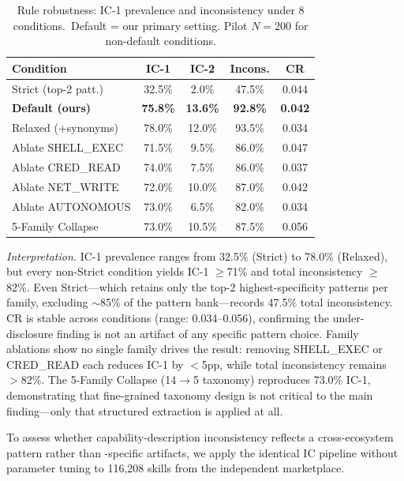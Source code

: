 \begin{table}[h]
\centering
\caption{Rule robustness: IC-1 prevalence and inconsistency under 8 conditions.\
  Default = our primary setting. Pilot $N{=}200$ for non-default conditions.}
\label{tab:robustness}
\footnotesize
\begin{tabular}{@{}p{3.0cm}cccc@{}}
\toprule
\textbf{Condition} & \textbf{IC-1} & \textbf{IC-2} & \textbf{Incons.} & \textbf{CR} \\
\midrule
Strict (top-2 patt.)      & 32.5\% & 2.0\%  & 47.5\% & 0.044 \\
\textbf{Default (ours)}   & \textbf{75.8\%} & \textbf{13.6\%} & \textbf{92.8\%} & \textbf{0.042} \\
Relaxed (+synonyms)       & 78.0\% & 12.0\% & 93.5\% & 0.034 \\
Ablate SHELL\_EXEC         & 71.5\% &  9.5\% & 86.0\% & 0.047 \\
Ablate CRED\_READ          & 74.0\% &  7.5\% & 86.0\% & 0.037 \\
Ablate NET\_WRITE          & 72.0\% & 10.0\% & 87.0\% & 0.042 \\
Ablate AUTONOMOUS          & 73.0\% &  6.5\% & 82.0\% & 0.034 \\
5-Family Collapse          & 73.0\% & 10.5\% & 87.5\% & 0.056 \\
\bottomrule
\end{tabular}
\end{table}

\noindent\textit{Interpretation.}
IC-1 prevalence ranges from 32.5\% (Strict) to 78.0\% (Relaxed), but every
non-Strict condition yields IC-1 $\geq$71\% and total inconsistency $\geq$82\%.
Even Strict---which retains only the top-2 highest-specificity patterns per
family, excluding $\sim$85\% of the pattern bank---records 47.5\% total
inconsistency.
CR is stable across conditions (range: 0.034--0.056), confirming the
under-disclosure finding is not an artifact of any specific pattern choice.
Family ablations show no single family drives the result: removing SHELL\_EXEC
or CRED\_READ each reduces IC-1 by $<$5pp, while total inconsistency remains
$>$82\%.
The 5-Family Collapse (14$\to$5 taxonomy) reproduces 73.0\% IC-1,
demonstrating that fine-grained taxonomy design is not critical to the
main finding---only that structured extraction is applied at all.



To assess whether capability-description inconsistency reflects a
cross-ecosystem pattern rather than \clawhub{}-specific artifacts,
we apply the identical IC pipeline without parameter tuning
to 116,208 skills from the independent \skillssh{} marketplace.

